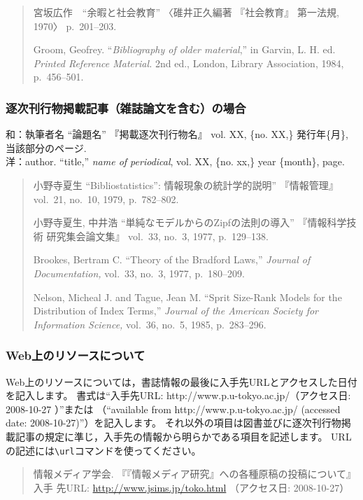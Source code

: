 \documentclass[b5paper,10pt,twocolumn,tombow]{jarticle}
\begin{document}
\begin{quote}
  宮坂広作　``余暇と社会教育'' 〈碓井正久編著 『社会教育』 第一法規,
  1970〉 p.~201--203.

  Groom, Geofrey. ``\textit{Bibliography of older material},'' in Garvin,
  L. H. ed. \textit{Printed Reference Material.} 2nd ed., London, Library
  Association, 1984, p.~456--501.
\end{quote}


\subsubsection{逐次刊行物掲載記事（雑誌論文を含む）の場合}
\noindent{}和：執筆者名 ``論題名'' 『掲載逐次刊行物名』 vol. XX,
\{no. XX,\} 発行年\{月\}, 当該部分のページ.\\
洋：author. ``title,'' \textit{name of periodical}, vol. XX,
\{no. xx,\} year \{month\}, page.


\begin{quote}
  小野寺夏生 ``Bibliostatistics'': 情報現象の統計学的説明'' 『情報管理』
  vol.~21, no.~10, 1979, p.~782--802.

  小野寺夏生, 中井浩 ``単純なモデルからのZipfの法則の導入'' 『情報科学技術
  研究集会論文集』 vol.~33, no.~3, 1977, p.~129--138.

  Brookes, Bertram C. ``Theory of the Bradford Laws,'' \textit{Journal of
  Documentation,} vol.~33, no.~3, 1977, p.~180--209.

  Nelson, Micheal J. and Tague, Jean M. ``Sprit Size-Rank Models for the
  Distribution of Index Terms,'' \textit{Journal of the American Society
  for Information Science,} vol.~36, no.~5, 1985, p.~283--296.
\end{quote}

\subsubsection{Web上のリソースについて}
Web上のリソースについては，書誌情報の最後に入手先URLとアクセスした日付を記入します。
書式は``入手先URL: http://www.p.u-tokyo.ac.jp/（アクセス日: 2008-10-27 ）''または
（``available from http://www.p.u-tokyo.ac.jp/ (accessed date: 2008-10-27)''）を記入します。
それ以外の項目は図書並びに逐次刊行物掲載記事の規定に準じ，入手先の情報から明らかである項目を記述します。
URLの記述には\verb|\url|コマンドを使ってください。

\begin{quote}
  情報メディア学会. 『『情報メディア研究』への各種原稿の投稿について』 入手
  先URL: \url{http://www.jsims.jp/toko.html} （アクセス日: 2008-10-27）
\end{quote}
\end{document}
